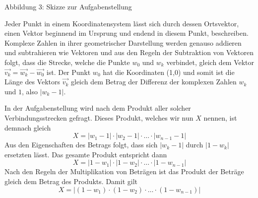 \documentclass[a4paper,12pt]{article} %
\begin{document}
\begin{center}

\begin{small}
	Abbildung 3: Skizze zur Aufgabenstellung
\end{small}

\end{center}



Jeder Punkt in einem Koordinatensystem lässt sich durch dessen Ortsvektor, einen Vektor beginnend im Ursprung und endend in diesem Punkt, beschreiben. Komplexe Zahlen in ihrer geometrischer Darstellung werden genauso addieren und subtrahieren wie Vektoren und aus den Regeln der Subtraktion von Vektoren folgt, dass die Strecke, welche die Punkte $w_0$ und $w_k$ verbindet, gleich dem Vektor $\vec{v_k}=\vec{w_k}-\vec{w_0}$ ist.
Der Punkt $w_0$ hat die Koordinaten (1,0) und somit ist die Länge des Vektors $\vec{v_k}$ gleich dem Betrag der Differenz der komplexen Zahlen $w_k$ und $1$, also $|w_k-1|$.


In der Aufgabenstellung wird nach dem Produkt aller solcher Verbindungsstrecken gefragt.
Dieses Produkt, welches wir nun $X$ nennen, ist demnach gleich
\[X = |w_1-1|\cdot|w_2-1|\cdot\ldots\cdot|w_{n-1}-1|\]
Aus den Eigenschaften des Betrags folgt, dass sich $|w_k-1|$ durch $|1-w_k|$ ersetzten lässt.
Das gesamte Produkt entspricht dann
\[X=|1-w_1|\cdot|1-w_2|\cdot\ldots\cdot|1-w_{n-1}|\]
Nach den Regeln der Multiplikation von Beträgen ist das Produkt der Beträge gleich dem Betrag des Produkts. Damit gilt
\begin{equation}\label{X}
	X=|(1-w_1)\cdot(1-w_2)\cdot\ldots\cdot(1-w_{n-1})|
\end{equation}
\end{document}
